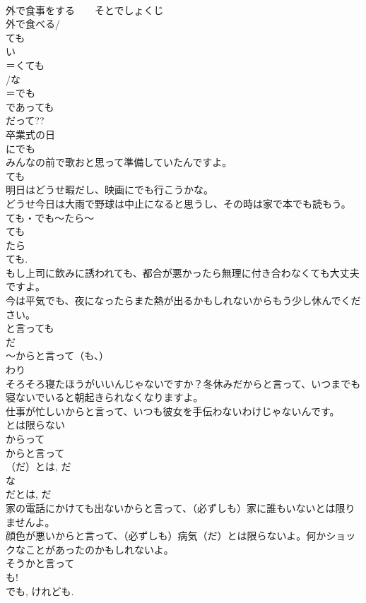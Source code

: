 \documentclass[8pt]{extreport}
\begin{document}
\begin{CJK}{UTF8}{min}
\\	外で食事をする　　そとでしょくじ
\\	外で食べる/
\\	ても
\\	い
\\	＝くても
\\	/な
\\	＝でも 
\\	であっても
\\	だって?? 
\\	卒業式の日
\\	にでも
\\	みんなの前で歌おと思って準備していたんですよ。
\\	ても 
\\	明日はどうせ暇だし、映画にでも行こうかな。
\\	どうせ今日は大雨で野球は中止になると思うし、その時は家で本でも読もう。
\\	ても・でも～たら～
\\	ても 
\\	たら 
\\	ても.
\\	もし上司に飲みに誘われても、都合が悪かったら無理に付き合わなくても大丈夫ですよ。
\\	今は平気でも、夜になったらまた熱が出るかもしれないからもう少し休んでください。
\\	と言っても
\\	だ 
\\	～からと言って（も、）
\\	わり 
\\	そろそろ寝たほうがいいんじゃないですか？冬休みだからと言って、いつまでも寝ないでいると朝起きられなくなりますよ。
\\	仕事が忙しいからと言って、いつも彼女を手伝わないわけじゃないんです。
\\	とは限らない 
\\	からって 
\\	からと言って
\\	（だ）とは, だ 
\\	な
\\	だとは, だ 
\\	家の電話にかけても出ないからと言って、（必ずしも）家に誰もいないとは限りませんよ。
\\	顔色が悪いからと言って、（必ずしも）病気（だ）とは限らないよ。何かショックなことがあったのかもしれないよ。
\\	そうかと言って
\\	も!
\\	でも, けれども. 

\end{CJK}
\end{document}
